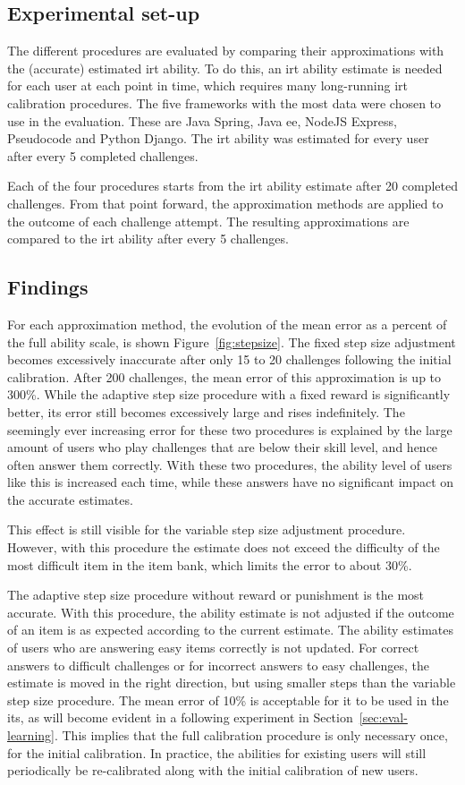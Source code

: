 \subsection{Experimental set-up}
The different procedures are evaluated by comparing their approximations with the (accurate) estimated \gls{irt} ability.
To do this, an \gls{irt} ability estimate is needed for each user at each point in time, which requires many long-running \gls{irt} calibration procedures.
The five frameworks with the most data were chosen to use in the evaluation.
These are Java Spring, Java \gls{ee}, NodeJS Express, Pseudocode and Python Django.
The \gls{irt} ability was estimated for every user after every 5 completed challenges.

Each of the four procedures starts from the \gls{irt} ability estimate after 20 completed challenges.
From that point forward, the approximation methods are applied to the outcome of each challenge attempt.
The resulting approximations are compared to the \gls{irt} ability after every 5 challenges.

\subsection{Findings}
For each approximation method, the evolution of the mean error as a percent of the full ability scale, is shown Figure~\ref{fig:stepsize}.
The fixed step size adjustment becomes excessively inaccurate after only 15 to 20 challenges following the initial calibration.
After 200 challenges, the mean error of this approximation is up to 300\%.
While the adaptive step size procedure with a fixed reward is significantly better, its error still becomes excessively large and rises indefinitely.
The seemingly ever increasing error for these two procedures is explained by the large amount of users who play challenges that are below their skill level, and hence often answer them correctly.
With these two procedures, the ability level of users like this is increased each time, while these answers have no significant impact on the accurate estimates.

This effect is still visible for the variable step size adjustment procedure.
However, with this procedure the estimate does not exceed the difficulty of the most difficult item in the item bank, which limits the error to about 30\%.

The adaptive step size procedure without reward or punishment is the most accurate.
With this procedure, the ability estimate is not adjusted if the outcome of an item is as expected according to the current estimate.
The ability estimates of users who are answering easy items correctly is not updated.
For correct answers to difficult challenges or for incorrect answers to easy challenges, the estimate is moved in the right direction, but using smaller steps than the variable step size procedure.
The mean error of 10\% is acceptable for it to be used in the \gls{its}, as will become evident in a following experiment in Section~\ref{sec:eval-learning}.
This implies that the full calibration procedure is only necessary once, for the initial calibration.
In practice, the abilities for existing users will still periodically be re-calibrated along with the initial calibration of new users.

